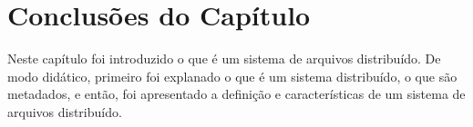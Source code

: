 		

	\section{Conclusões do Capítulo}
Neste capítulo foi introduzido o que é um sistema de arquivos distribuído. De modo didático, primeiro foi explanado o que é um sistema distribuído, o que são metadados, e então, foi apresentado a definição e características de um sistema de arquivos distribuído.
 

	

